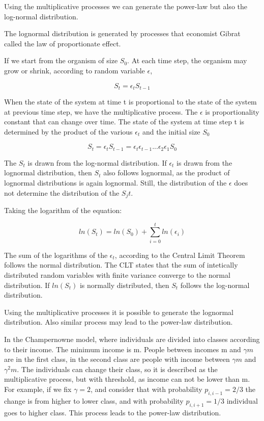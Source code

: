Using the multiplicative processes we can generate the power-law but also the log-normal distribution. 

The lognormal distribution is generated by processes that economist Gibrat called the law of proportionate effect. 

If we start from the organism of size $S_0$. At each time step, the organism may grow or shrink,  according to random variable $\epsilon$, 

$$S_t = \epsilon_t S_{t-1}$$   

When the state of the system at time t is proportional to the state of the system at previous time step, we have the multiplicative process. The $\epsilon$ is proportionality constant that can change over time. The state of the system at time step t is determined by the product of the various $\epsilon_t$ and the initial size $S_0$ 

$$S_t = \epsilon_t S_{t-1} = \epsilon_t \epsilon_{t-1}... \epsilon_2 \epsilon_1 S_{0} $$

The $S_t$ is drawn from the log-normal distribution. If $\epsilon_t$ is drawn from the lognormal distribution, then $S_t$ also follows lognormal, as the product of lognormal distributions is again lognormal. Still, the distribution of the $\epsilon$ does not determine the distribution of the $S_jt$. 

Taking the logarithm of the equation:

$$ln(S_t) = ln(S_0) + \sum_{i=0}^{t} ln(\epsilon_i)$$

The sum of the logarithms of the $\epsilon_t$, according to the Central Limit Theorem follows the normal distribution. The CLT states that the sum of intetically distributed random variables with finite variance converge to the normal distribution. If $ln(S_t)$ is normally distributed, then $S_t$ follows the log-normal distribution.   

Using the multiplicative processes it is possible to generate the lognormal distribution. Also similar process may lead to the power-law distribution. 

In the Champernowne model, where individuals are divided into classes according to their income. The minimum income is m. People between incomes m and $\gamma m$ are in the first class, in the second class are people with income between $\gamma m$ and $\gamma^2 m $. The individuals can change their class, so it is described as the multiplicative process, but with threshold, as income can not be lower than m. For example, if we fix $\gamma=2$, and consider that with probability $p_{i,i-1}=2/3$ the change is from higher to lower class, and with probability $p_{i, i+1}=1/3$ individual goes to higher class. This process leads to the power-law distribution.


